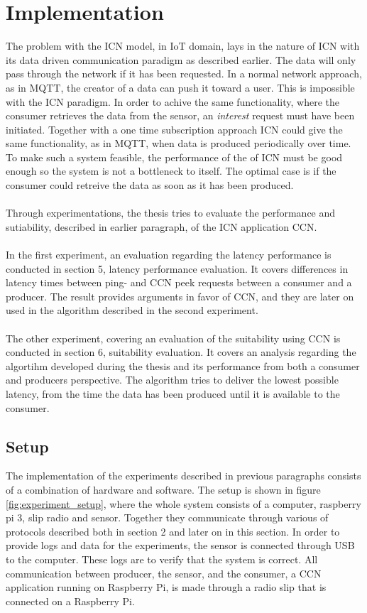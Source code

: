 \section{Implementation}
The problem with the ICN model, in IoT domain, lays in the nature of ICN with its data driven communication paradigm as described earlier. The data will only pass through the network if it has been requested. In a normal network approach, as in MQTT, the creator of a data can push it toward a user. This is impossible with the ICN paradigm. 
In order to achive the same functionality, where the consumer retrieves the data from the sensor, an \textit{interest} request must have been initiated. Together with a one time subscription approach ICN could give the same functionality, as in MQTT, when data is produced periodically over time. To make such a system feasible, the performance of the of ICN must be good enough so the system is not a bottleneck to itself. The optimal case is if the consumer could retreive the data as soon as it has been produced.\\\\
Through experimentations, the thesis tries to evaluate the performance and sutiability, described in earlier paragraph, of the ICN application CCN.\\\\
In the first experiment, an evaluation regarding the latency performance is conducted in section 5, latency performance evaluation. It covers differences in latency times between ping- and CCN peek requests between a consumer and a producer. The result provides arguments in favor of CCN, and they are later on used in the algorithm described in the second experiment.\\\\
The other experiment, covering an evaluation of the suitability using CCN is conducted in section 6, suitability evaluation. It covers an analysis regarding the algortihm developed during the thesis and its performance from both a consumer and producers perspective. The algorithm tries to deliver the lowest possible latency, from the time the data has been produced until it is available to the consumer. 


\subsection{Setup}
The implementation of the experiments described in previous paragraphs consists of a combination of hardware and software. The setup is shown in figure \ref{fig:experiment_setup}, where the whole system consists of a computer, raspberry pi 3, slip radio and sensor. Together they communicate through various of protocols described both in section 2 and later on in this section. 
In order to provide logs and data for the experiments, the sensor is connected through USB to the computer. These logs are to verify that the system is correct. All communication between producer, the sensor, and the consumer, a CCN application running on Raspberry Pi, is made through a radio slip that is connected on a Raspberry Pi.

